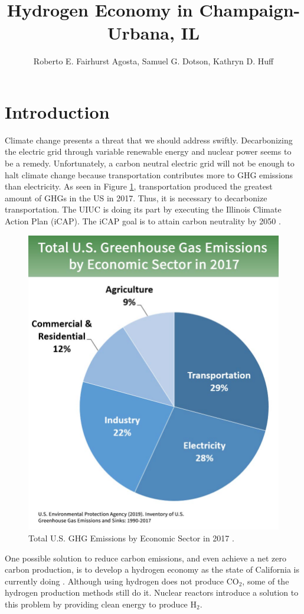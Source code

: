 \documentclass{anstrans}
\title{Hydrogen Economy in Champaign-Urbana, IL}
\author{Roberto E. Fairhurst Agosta, Samuel G. Dotson, Kathryn D. Huff}
\institute{
University of Illinois at Urbana-Champaign, Dept. of Nuclear, Plasma, and Radiological Engineering\\
ref3@illinois.edu
}
\begin{document}
\section{Introduction}

Climate change presents a threat that we should address swiftly. Decarbonizing the electric grid through variable renewable energy and nuclear power seems to be a remedy. Unfortunately, a carbon neutral electric grid will not be enough to halt climate change because transportation contributes more to \gls{GHG} emissions than electricity. As seen in Figure \ref{fig:ghg}, transportation produced the greatest amount of \glspl{GHG} in the US in 2017. Thus, it is necessary to decarbonize transportation. The \gls{UIUC} is doing its part by executing the Illinois Climate Action Plan (iCAP). The iCAP goal is to attain carbon neutrality by 2050 \cite{noauthor_illlinois_2015}.

\begin{figure}[H]
	\centering
	\includegraphics[width=0.6\linewidth]{figures/total-ghg-2019-caption.jpg}
	\hfill
	\caption{Total U.S. GHG Emissions by Economic Sector in 2017 \cite{us_epa_sources_2020}.}
	\label{fig:ghg}
\end{figure}

One possible solution to reduce carbon emissions, and even achieve a net zero carbon production, is to develop a hydrogen economy as the state of California is currently doing \cite{brown_economic_2013}. Although using hydrogen does not produce CO$_2$, some of the hydrogen production methods still do it. Nuclear reactors introduce a solution to this problem by providing clean energy to produce H$_2$.
\end{document}
